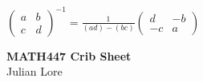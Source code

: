 \documentclass[10pt,landscape]{article}
\begin{document}
        \begin{minipage}{0.34\textwidth}
          $
          \begin{pmatrix}
            a & b
            \\ c & d
          \end{pmatrix}^{-1} = \frac{1}{(ad)-(bc)}
          \begin{pmatrix}
            d & -b
            \\ -c & a
          \end{pmatrix}
          $
        \end{minipage}
\raggedright
\footnotesize
\begin{multicols*}{3}
\setlength{\premulticols}{1pt}
\setlength{\postmulticols}{1pt}
\setlength{\multicolsep}{1pt}
\setlength{\columnsep}{2pt}

\begin{center}
  \Large{\textbf{MATH447 Crib Sheet}} \\
  Julian Lore
\end{center}

\end{multicols*}
\end{document}
